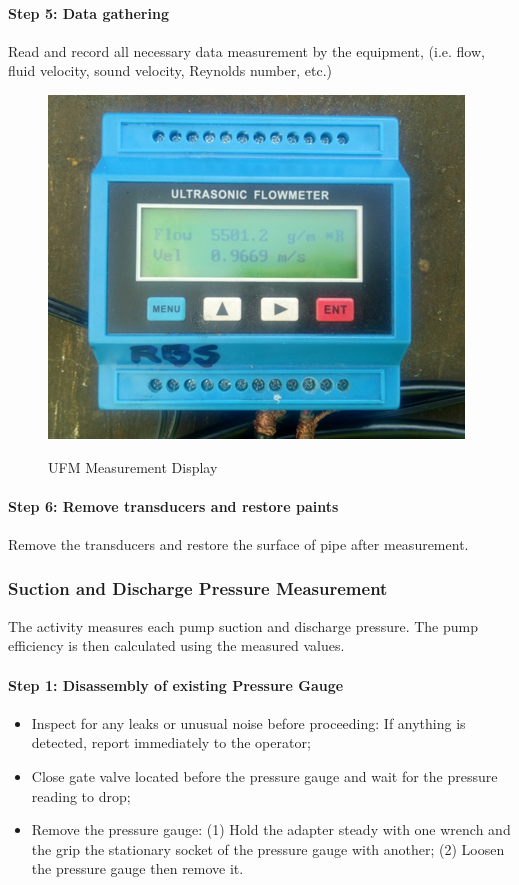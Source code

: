 \paragraph{Step 5: Data gathering}
Read and record all necessary data measurement by the equipment, (i.e. flow, fluid velocity, sound velocity, Reynolds number, etc.) 

\begin{figure}[!htb]
	\includegraphics[scale=1.3]{figures/ch02_flowmeasurement07} \\
	\caption{UFM Measurement Display}
	\label{ch02_flowmeasurement07} 
\end{figure}

\paragraph{Step 6: Remove transducers and restore paints}
Remove the transducers and restore the surface of pipe after measurement.

\subsubsection{Suction and Discharge Pressure Measurement}
The activity measures each pump suction and discharge pressure. The pump efficiency is then calculated using the measured values.

\paragraph{Step 1: Disassembly of existing Pressure Gauge}
\begin{itemize}
\item Inspect for any leaks or unusual noise before proceeding: If anything is detected, report immediately to the operator;
\item 	Close gate valve located before the pressure gauge and wait for the pressure reading to drop;
\item 	Remove the pressure gauge: (1) Hold the adapter steady with one wrench and the grip the stationary socket of the pressure gauge with another; (2) Loosen the pressure gauge then remove it.
\end{itemize}


